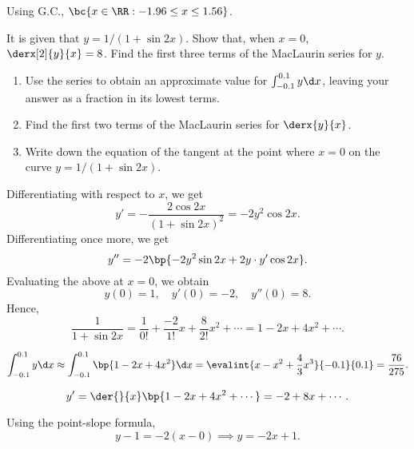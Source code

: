 \begin{solution}
\begin{ppart}
\begin{center}
        \end{center}
    \end{ppart}
    \begin{ppart}
        Using G.C., $\bc{x \in \RR : -1.96 \leq x \leq 1.56}$.
    \end{ppart}
\end{solution}

\begin{problem}
    It is given that $y = 1/(1 + \sin 2x)$. Show that, when $x = 0$, $\derx[2]{y}{x} = 8$. Find the first three terms of the MacLaurin series for $y$.

    \begin{enumerate}
        \item Use the series to obtain an approximate value for $\int_{-0.1}^{0.1} y \d x$, leaving your answer as a fraction in its lowest terms.
        \item Find the first two terms of the MacLaurin series for $\derx{y}{x}$.
        \item Write down the equation of the tangent at the point where $x = 0$ on the curve $y = 1/(1 + \sin 2x)$.
    \end{enumerate}
\end{problem}
\begin{solution}
    Differentiating with respect to $x$, we get \[y' = -\frac{2\cos2x}{(1 + \sin 2x)^2} = -2y^2 \cos 2x.\] Differentiating once more, we get \[y'' = -2\bp{-2y^2\sin 2x + 2y \cdot y'\cos 2x }.\] Evaluating the above at $x = 0$, we obtain \[y(0) = 1, \quad y'(0) = -2, \quad y''(0) = 8.\] Hence, \[\frac1{1 + \sin 2x} = \frac{1}{0!} + \frac{-2}{1!}x + \frac{8}{2!}x^2 + \cdots = 1 - 2x + 4x^2 + \cdots.\]

    \begin{ppart}
        \[\int_{-0.1}^{0.1} y \d x \approx \int_{-0.1}^{0.1} \bp{1 - 2x + 4x^2 } \d x = \evalint{x - x^2 + \frac43 x^3}{-0.1}{0.1} = \frac{76}{275}.\]
    \end{ppart}
    \begin{ppart}
        \[y' = \der{}{x} \bp{1 - 2x + 4x^2 + \cdots} = -2 + 8x + \cdots.\]
    \end{ppart}
    \begin{ppart}
        Using the point-slope formula, \[y-1=-2(x-0) \implies y = -2x + 1.\]
    \end{ppart}
\end{solution}


